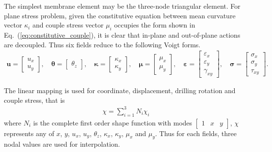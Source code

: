 \documentclass[3p,sort&compress,11pt,fleqn]{elsarticle}
\newcommand*{\eqsref}[1]{Eq.~(\ref{#1})}
\begin{document}
The simplest membrane element may be the three-node triangular element. For plane stress problem, given the constitutive equation between mean curvature vector $\kappa_i$ and couple stress vector $\mu_i$ occupies the form shown in \eqsref{eq:constitutive_couple}, it is clear that in-plane and out-of-plane actions are decoupled. Thus six fields reduce to the following Voigt forms.
\begin{gather}
\mathbold{u}=\begin{bmatrix}
u_x\\u_y
\end{bmatrix},\quad
\mathbold{\theta}=\begin{bmatrix}
\theta_z
\end{bmatrix},\quad
\mathbold{\kappa}=\begin{bmatrix}
\kappa_x\\\kappa_y
\end{bmatrix},\quad
\mathbold{\mu}=\begin{bmatrix}
\mu_x\\\mu_y
\end{bmatrix},\quad
\mathbold{\varepsilon}=\begin{bmatrix}
\varepsilon_x\\\varepsilon_y\\\gamma_{xy}
\end{bmatrix},\quad
\mathbold{\sigma}=\begin{bmatrix}
\sigma_x\\\sigma_y\\\tau_{xy}
\end{bmatrix}.
\end{gather}

The linear mapping is used for coordinate, displacement, drilling rotation and couple stress, that is
\begin{gather}
\chi=\sum_{i=1}^3N_i\chi_i
\end{gather}
where $N_i$ is the complete first order shape function with modes $\begin{bmatrix}
1&x&y
\end{bmatrix}$, $\chi$ represents any of $x$, $y$, $u_x$, $u_y$, $\theta_z$, $\kappa_x$, $\kappa_y$, $\mu_x$ and $\mu_y$. Thus for each fields, three nodal values are used for interpolation.
\end{document}

